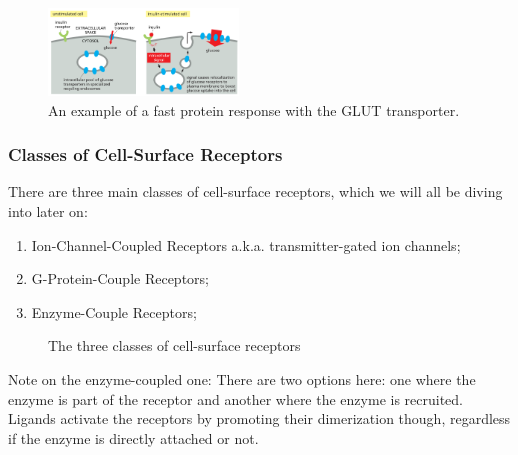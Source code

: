 \documentclass[../main.tex]{subfiles}
\begin{document}
\begin{figure}[H]
	\centering
	\includegraphics[width=0.45\textwidth]{GLUT_fast}
	\caption{An example of a fast protein response with the GLUT transporter.}
\end{figure}

\subsubsection{Classes of Cell-Surface Receptors}

There are three main classes of cell-surface receptors, which we will all be diving into later on:
\begin{enumerate}
	\item Ion-Channel-Coupled Receptors a.k.a. transmitter-gated ion channels;
	\item G-Protein-Couple Receptors;
	\item Enzyme-Couple Receptors;
\end{enumerate}

\begin{figure}[h]
	\centering
	\hfill
		\hfill
	\caption{The three classes of cell-surface receptors}
\end{figure}
Note on the enzyme-coupled one: There are two options here: one where the enzyme is part of the receptor and another where the enzyme is recruited. Ligands activate the receptors by promoting their dimerization though, regardless if the enzyme is directly attached or not.
\end{document}
